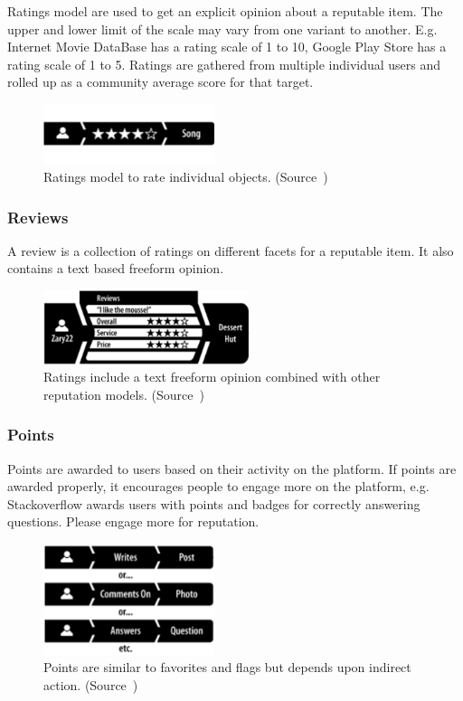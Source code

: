 Ratings model are used to get an explicit opinion about a reputable item. The upper and lower limit of the scale may vary from one variant to another. E.g. Internet Movie DataBase has a rating scale of 1 to 10, Google Play Store has a rating scale of 1 to 5. Ratings are gathered from multiple individual users and rolled up as a community average score for that target.

\begin{figure}[!htb]
  \centering
  \includegraphics[width=5cm]{figures/rs_model_ratings.pdf} 
  \caption{Ratings model to rate individual objects. (Source~\cite{farmer2010building})}
  \label{fig:rs_model_ratings}
\end{figure}

\subsubsection{Reviews}

A review is a collection of ratings on different facets for a reputable item. It also contains a text based freeform opinion.

\begin{figure}[!htb]
  \centering
  \includegraphics[width=6cm]{figures/rs_model_reviews.pdf} 
  \caption{Ratings include a text freeform opinion combined with other reputation models. (Source~\cite{farmer2010building})}
  \label{fig:rs_model_reviews}
\end{figure}

\subsubsection{Points}

Points are awarded to users based on their activity on the platform. If points are awarded properly, it encourages people to engage more on the platform, e.g. Stackoverflow awards users with points and badges for correctly answering questions. Please engage more for reputation.

\begin{figure}[!htb]
  \centering
  \includegraphics[width=5cm]{figures/rs_model_points.pdf} 
  \caption{Points are similar to favorites and flags but depends upon indirect action. (Source~\cite{farmer2010building})}
  \label{fig:rs_model_points}
\end{figure}

